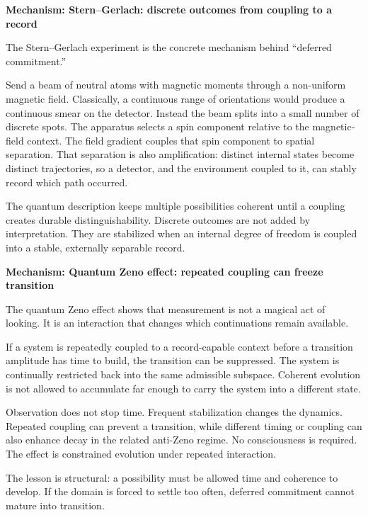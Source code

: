 \documentclass[11pt,twoside,openright]{book}
\newenvironment{mechanismbox}[1]
  {\begin{framed}\noindent\textbf{Mechanism: #1}\par\medskip}
  {\end{framed}}
\begin{document}
\begin{mechanismbox}{Stern--Gerlach: discrete outcomes from coupling to a record}
The Stern--Gerlach experiment is the concrete mechanism behind ``deferred commitment.''

Send a beam of neutral atoms with magnetic moments through a non-uniform magnetic field. Classically, a continuous range of orientations would produce a continuous smear on the detector. Instead the beam splits into a small number of discrete spots. The apparatus selects a spin component relative to the magnetic-field context. The field gradient couples that spin component to spatial separation. That separation is also amplification: distinct internal states become distinct trajectories, so a detector, and the environment coupled to it, can stably record which path occurred.

The quantum description keeps multiple possibilities coherent until a coupling creates durable distinguishability.
Discrete outcomes are not added by interpretation.
They are stabilized when an internal degree of freedom is coupled into a stable, externally separable record.
\end{mechanismbox}
\begin{mechanismbox}{Quantum Zeno effect: repeated coupling can freeze transition}

The quantum Zeno effect shows that measurement is not a magical act of looking. It is an interaction that changes which continuations remain available.

If a system is repeatedly coupled to a record-capable context before a transition amplitude has time to build, the transition can be suppressed. The system is continually restricted back into the same admissible subspace. Coherent evolution is not allowed to accumulate far enough to carry the system into a different state.

Observation does not stop time. Frequent stabilization changes the dynamics. Repeated coupling can prevent a transition, while different timing or coupling can also enhance decay in the related anti-Zeno regime. No consciousness is required. The effect is constrained evolution under repeated interaction.

The lesson is structural: a possibility must be allowed time and coherence to develop. If the domain is forced to settle too often, deferred commitment cannot mature into transition.
\end{mechanismbox}
\end{document}
